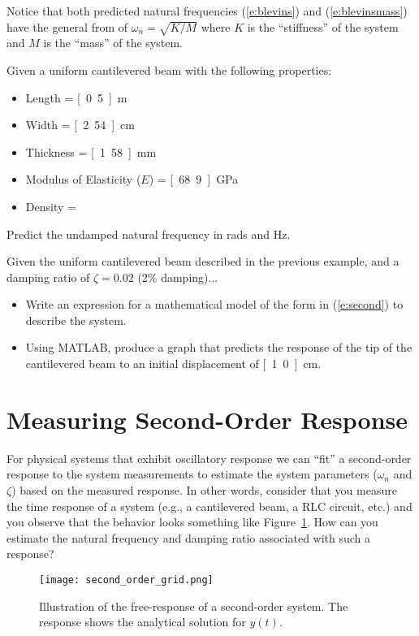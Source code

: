 Notice that both predicted natural frequencies (\ref{e:blevins}) and (\ref{e:blevinsmass}) have the general from of $\omega_n = \sqrt{K/M}$ where $K$ is the ``stiffness'' of the system and $M$ is the ``mass'' of the system.


\begin{ex}
Given a uniform cantilevered beam with the following properties:
\begin{itemize}
\item Length = \unit[0.5]{m}
\item Width = \unit[2.54]{cm}
\item Thickness = \unit[1.58]{mm}
\item Modulus of Elasticity ($E$) = \unit[68.9]{GPa}
\item Density = 
\end{itemize}
Predict the undamped natural frequency in \unit[]{rad}{s} and \unit[]{Hz}.
\end{ex}

\begin{ex}
Given the uniform cantilevered beam described in the previous example, and a damping ratio of $\zeta=0.02$ (2\% damping)...
\begin{itemize}
\item Write an expression for a mathematical model of the form in (\ref{e:second}) to describe the system.
\item Using MATLAB, produce a graph that predicts the response of the tip of the cantilevered beam to an initial displacement of \unit[1.0]{cm}.
\end{itemize}
\end{ex}

\section{Measuring Second-Order Response}
For physical systems that exhibit oscillatory response we can ``fit'' a second-order response to the system measurements to estimate the system parameters ($\omega_n$ and $\zeta$) based on the measured response.  In other words, consider that you measure the time response of a system (e.g., a cantilevered beam, a RLC circuit, etc.) and you observe that the behavior looks something like Figure~\ref{f:secondfreeresp}.  How can you estimate the natural frequency and damping ratio associated with such a response?

\begin{figure}[h!bt]
\centerline{
{\texttt{[image: second\_order\_grid.png]}}}
\caption{Illustration of the free-response of a second-order system.  The response shows the analytical solution for $y(t)$.}
\label{f:secondfreeresp}
\end{figure}

